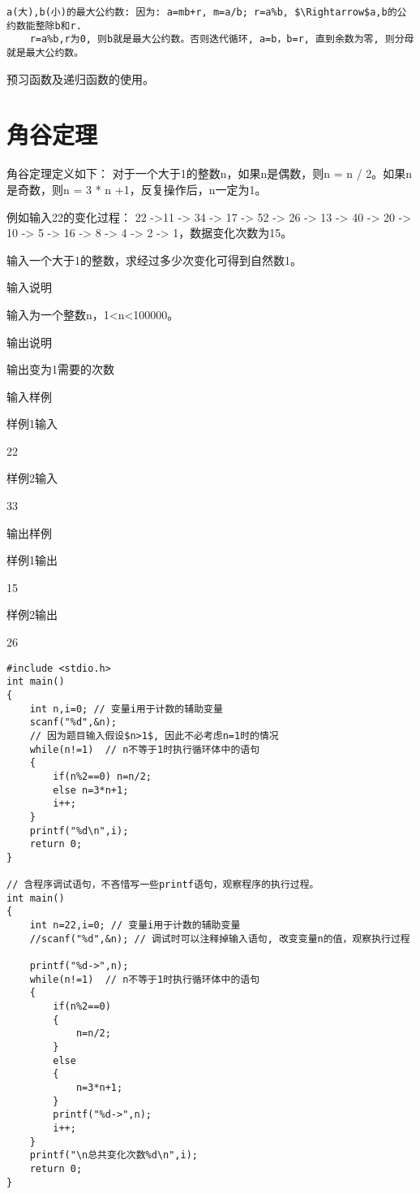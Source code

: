 \begin{note}[欧几里得定理]
	\begin{lstlisting}[frame=none]
	a(大),b(小)的最大公约数: 因为: a=mb+r, m=a/b; r=a%b, $\Rightarrow$a,b的公约数能整除b和r.
	r=a%b,r为0, 则b就是最大公约数。否则迭代循环, a=b，b=r, 直到余数为零, 则分母就是最大公约数。
	\end{lstlisting}
\end{note}

\begin{note}
	预习函数及递归函数的使用。
\end{note}

\section{角谷定理}
角谷定理定义如下：
对于一个大于1的整数n，如果n是偶数，则n = n / 2。如果n是奇数，则n = 3 * n +1，反复操作后，n一定为1。

例如输入22的变化过程： 22 ->11 -> 34 -> 17 -> 52 -> 26 -> 13 -> 40 -> 20 -> 10 -> 5 -> 16 -> 8 -> 4 -> 2 -> 1，数据变化次数为15。

输入一个大于1的整数，求经过多少次变化可得到自然数1。

输入说明	

输入为一个整数n，1<n<100000。

输出说明	

输出变为1需要的次数

输入样例

样例1输入

22

样例2输入

33

输出样例

样例1输出

15

样例2输出

26

\begin{lstlisting}
#include <stdio.h>
int main()
{
	int n,i=0; // 变量i用于计数的辅助变量
	scanf("%d",&n);
	// 因为题目输入假设$n>1$, 因此不必考虑n=1时的情况
	while(n!=1)  // n不等于1时执行循环体中的语句
	{
		if(n%2==0) n=n/2;
		else n=3*n+1;
		i++;
	} 
	printf("%d\n",i);
	return 0;	
}

// 含程序调试语句，不吝惜写一些printf语句，观察程序的执行过程。 
int main()
{
	int n=22,i=0; // 变量i用于计数的辅助变量
	//scanf("%d",&n); // 调试时可以注释掉输入语句, 改变变量n的值，观察执行过程 
	
	printf("%d->",n);
	while(n!=1)  // n不等于1时执行循环体中的语句
	{
		if(n%2==0) 
		{ 
			n=n/2;
		} 
		else 
		{
			n=3*n+1;
		}
		printf("%d->",n);
		i++;
	} 
	printf("\n总共变化次数%d\n",i);
	return 0;	
}
\end{lstlisting}

